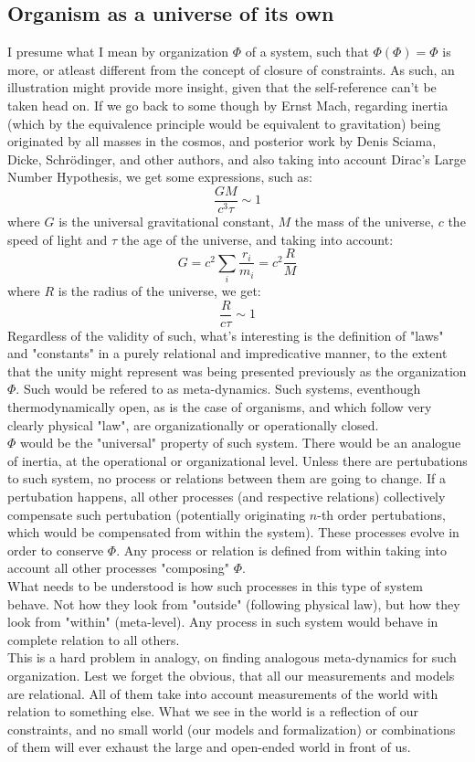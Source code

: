 \documentclass[a4paper,12pt,twoside,leqno]{article}
\begin{document}
\subsection*{Organism as a universe of its own}
I presume what I mean by organization $\Phi$ of a system, such that $\Phi (\Phi) = \Phi$ is more, or atleast different from the concept of closure of constraints. As such, an illustration might provide more insight, given that the self-reference can't be taken head on. If we go back to some though by Ernst Mach, regarding inertia (which by the equivalence principle would be equivalent to gravitation) being originated by all masses in the cosmos, and posterior work by Denis Sciama, Dicke, Schrödinger, and other authors, and also taking into account Dirac's Large Number Hypothesis, we get some expressions, such as:
$$
\frac{GM}{c^{3}\tau} \sim 1
$$
where $G$ is the universal gravitational constant, $M$ the mass of the universe, $c$ the speed of light and $\tau$ the age of the universe, and taking into account:
$$
G = c^{2} \sum_{i} \frac{r_{i}}{m_{i}} = c^{2} \frac{R}{M}
$$
where $R$ is the radius of the universe, we get:
$$
\frac{R}{c \tau} \sim 1
$$
Regardless of the validity of such, what's interesting is the definition of "laws" and "constants" in a purely relational and impredicative manner, to the extent that the unity might represent was being presented previously as the organization $\Phi$. Such would be refered to as meta-dynamics. Such systems, eventhough thermodynamically open, as is the case of organisms, and which follow very clearly physical "law", are organizationally or operationally closed.\\
$\Phi$ would be the "universal" property of such system. There would be an analogue of inertia, at the operational or organizational level. Unless there are pertubations to such system, no process or relations between them are going to change. If a pertubation happens, all other processes (and respective relations) collectively compensate such pertubation (potentially originating $n$-th order pertubations, which would be compensated from within the system). These processes evolve in order to conserve $\Phi$. Any process or relation is defined from within taking into account all other processes "composing" $\Phi$.\\
What needs to be understood is how such processes in this type of system behave. Not how they look from "outside" (following physical law), but how they look from "within" (meta-level). Any process in such system would behave in complete relation to all others.\\
This is a hard problem in analogy, on finding analogous meta-dynamics for such organization. Lest we forget the obvious, that all our measurements and models are relational. All of them take into account measurements of the world with relation to something else. What we see in the world is a reflection of our constraints, and no small world (our models and formalization) or combinations of them will ever exhaust the large and open-ended world in front of us. 
\end{document}
